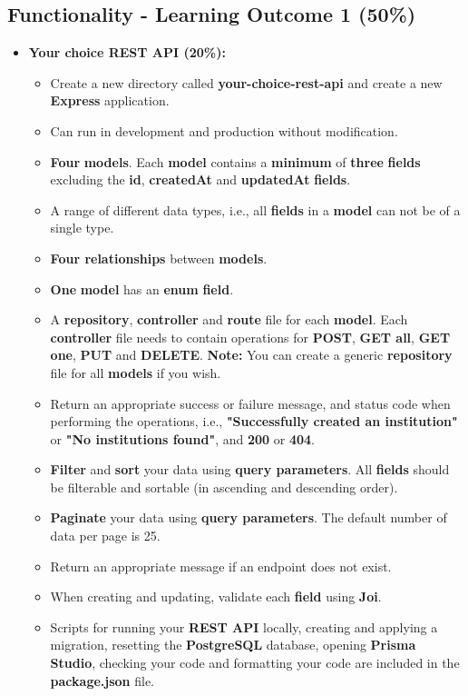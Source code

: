 \documentclass{article}
\begin{document}
\subsection*{Functionality - Learning Outcome 1 (50\%)}
\begin{itemize} 
	\item \textbf{Your choice REST API (20\%):}
	\begin{itemize}
		\item Create a new directory called \textbf{your-choice-rest-api} and create a new \textbf{Express} application.
		\item Can run in development and production without modification.
		\item \textbf{Four} \textbf{models}. Each \textbf{model} contains a \textbf{minimum} of \textbf{three} \textbf{fields} excluding the \textbf{id}, \textbf{createdAt} and \textbf{updatedAt} \textbf{fields}.
		\item A range of different data types, i.e., all \textbf{fields} in a \textbf{model} can not be of a single type.
		\item \textbf{Four relationships} between \textbf{models}.
		\item \textbf{One} \textbf{model} has an \textbf{enum} \textbf{field}. 
		\item A \textbf{repository}, \textbf{controller} and \textbf{route} file for each \textbf{model}. Each \textbf{controller} file needs to contain operations for \textbf{POST}, \textbf{GET all}, \textbf{GET one}, \textbf{PUT} and \textbf{DELETE}. \textbf{Note:} You can create a generic \textbf{repository} file for all \textbf{models} if you wish.
		\item Return an appropriate success or failure message, and status code when performing the operations, i.e., \textbf{"Successfully created an institution"} or \textbf{"No institutions found"}, and \textbf{200} or \textbf{404}.
		\item \textbf{Filter} and \textbf{sort} your data using \textbf{query parameters}. All \textbf{fields} should be filterable and sortable (in ascending and descending order).
		\item \textbf{Paginate} your data using \textbf{query parameters}. The default number of data per page is 25.
		\item Return an appropriate message if an endpoint does not exist.
		\item When creating and updating, validate each \textbf{field} using \textbf{Joi}. 
		\item Scripts for running your \textbf{REST API} locally, creating and applying a migration, resetting the \textbf{PostgreSQL} database, opening \textbf{Prisma Studio}, checking your code and formatting your code are included in the \textbf{package.json} file.
	\end{itemize}


\end{itemize}
\end{document}
